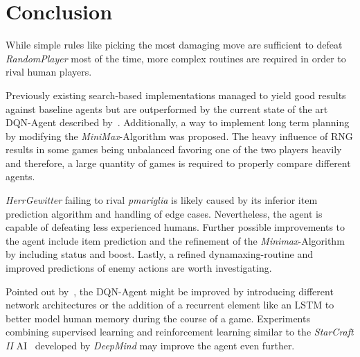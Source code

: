 
\chapter{Conclusion}
\label{ch:conclusion}
While simple rules like picking the most damaging move are sufficient to defeat 
\textit{RandomPlayer} most of the time, more complex routines are required 
in order to rival human players. 

Previously existing search-based implementations managed to yield good results against 
baseline agents but are outperformed by the current state of the art DQN-Agent 
described by~\cite{Huang_Lee_2019}. 
Additionally, a way to implement long term planning by modifying the \textit{MiniMax}-Algorithm
was proposed. The heavy influence of \ac{RNG} results in some games being unbalanced favoring one
of the two players heavily and therefore, a large quantity of games is required to properly 
compare different agents.

\textit{HerrGewitter} failing to rival \textit{pmariglia} is likely caused by its inferior
item prediction algorithm and handling of edge cases. Nevertheless, the agent is capable
of defeating less experienced humans. Further possible improvements to the agent include
item prediction and the refinement of the \textit{Minimax}-Algorithm by including status
and boost. Lastly, a refined dynamaxing-routine and improved
predictions of enemy actions are worth investigating.

Pointed out by~\cite{Huang_Lee_2019}, the DQN-Agent might be improved
by introducing \grqq different network architectures or the addition
of a recurrent element like an LSTM to better model human memory during the 
course of a game\grqq. Experiments combining supervised learning and
reinforcement learning similar to the \textit{StarCraft II} AI~\cite{OpenAI:AlphaStar}
developed by \textit{DeepMind} may improve the agent even further. 